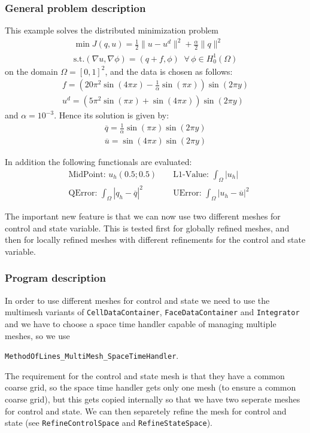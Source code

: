 \subsubsection{General problem description}
This example solves the distributed minimization problem
\begin{gather*}
\min J(q,u) = \frac{1}{2} \|u-u^d\|^2 + \frac{\alpha}{2}\|q\|^2\\
\text{s.t.} (\nabla u,\nabla \phi) = (q+f,\phi)\;\;\forall\,\phi \in H^1_0(\Omega)
\end{gather*}
on the domain $\Omega = [0,1]^2$, and the data is chosen as follows:
\begin{gather*}
 f = \left(20\pi^2  \sin(4 \pi x) - \frac{1}{\alpha}  \sin(\pi x)\right) \sin(2 \pi y)\\
 u^d = \left( 5 \pi^2 \sin(\pi x) + \sin(4 \pi x)\right)  \sin(2\pi y)
\end{gather*}
and $\alpha = 10^{-3}$.
Hence its solution is given by:
\begin{gather*}
 \overline{q} = \frac{1}{\alpha} \sin(\pi x) \sin(2 \pi y)\\
 \overline{u} = \sin(4 \pi x) \sin(2 \pi y)
\end{gather*}

In addition the following functionals are evaluated:
\begin{align*}
  &\text{MidPoint: } u_h(0.5 ; 0.5)&&
  \text{ L1-Value: }\int_\Omega |u_h|\\
  &\text{QError: }\int_\Omega |q_h-\overline{q}|^2
  &&\text{  UError: }\int_\Omega |u_h-\overline{u}|^2
\end{align*}
 
The important new feature is that we can now use two different meshes for control and state variable.
This is tested first for globally refined meshes, and then for locally refined meshes with different refinements for the control and state variable.
\subsubsection{Program description}
In order to use different meshes for control and state we need to use the multimesh variants of \texttt{CellDataContainer}, \texttt{FaceDataContainer} and \texttt{Integrator} and we have to choose a space time handler capable of managing multiple meshes, so we use 

\texttt{MethodOfLines\_MultiMesh\_SpaceTimeHandler}.

The requirement for the control and state mesh is that they have a common coarse grid, so the space time handler gets only one mesh (to ensure a common coarse grid), but this gets copied internally so that we have two seperate meshes for control and state. We can then separetely refine the mesh for control and state (see \texttt{RefineControlSpace} and  \texttt{RefineStateSpace}).

